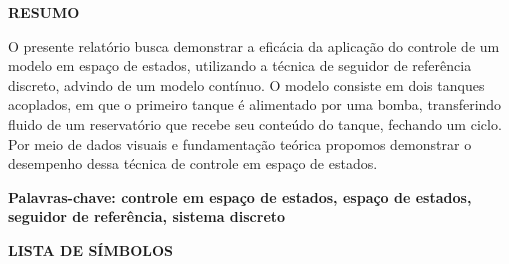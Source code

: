 \documentclass[a4paper,12pt]{article}
\begin{document}
\newpage


\thispagestyle{empty}

\begin{center}
{\large \textbf{RESUMO}}
\end{center}

\vspace{3cm}

\begin{flushleft}

\hspace{4ex}O presente relatório busca demonstrar a eficácia da aplicação do controle de um modelo em espaço de estados, utilizando a técnica de seguidor de referência discreto, advindo de um modelo contínuo. O modelo consiste em dois tanques acoplados, em que o primeiro tanque é alimentado por uma bomba, transferindo fluido de um reservatório que recebe seu conteúdo do tanque, fechando um ciclo. Por meio de dados visuais e fundamentação teórica propomos demonstrar o desempenho dessa técnica de controle em espaço de estados.\\

\end{flushleft}

\vspace{1.5cm}

\textbf{Palavras-chave: controle em espaço de estados, espaço de estados, seguidor de referência, sistema discreto}

\newpage


\thispagestyle{empty}

\begin{center}
{\large \textbf{LISTA DE SÍMBOLOS}}
\end{center}

\vspace{3cm}
\end{document}
